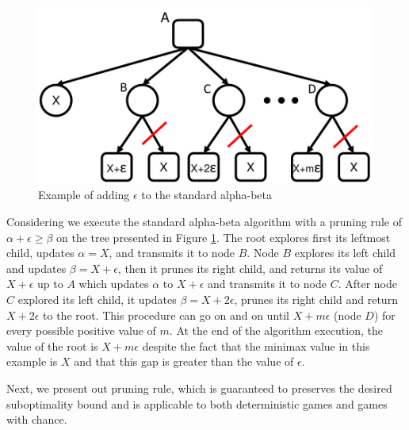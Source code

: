 \documentclass[runningheads]{llncs}
\begin{document}
\begin{figure}
	\centering
	\includegraphics[width=0.85\columnwidth]{Figures/example_e.pdf}
	\caption{Example of adding $\epsilon$ to the standard alpha-beta}
	\label{fig:example-e}
\end{figure}

Considering we execute the standard alpha-beta algorithm with a pruning rule of $\alpha+\epsilon \geq \beta$ on the tree presented in Figure \ref{fig:example-e}.
The root explores first its leftmost child, updates $\alpha=X$, and transmits it to node $B$.
Node $B$ explores its left child and updates $\beta=X+\epsilon$, then it prunes its right child, and returns its value of $X+\epsilon$ up to $A$ which updates $\alpha$ to $X+\epsilon$ and transmits it to node $C$.
After node $C$ explored its left child, it updates $\beta=X+2\epsilon$, prunes its right child and return $X+2\epsilon$ to the root.
This procedure can go on and on until $X+m\epsilon$ (node $D$) for every possible positive value of $m$.
At the end of the algorithm execution, the value of the root is $X+m\epsilon$ despite the fact that the minimax value in this example is $X$ and that this gap is greater than the value of $\epsilon$.


Next, we present out pruning rule, which is guaranteed to preserves the desired suboptimality bound and is applicable to both deterministic games and games with chance. 
\end{document}
